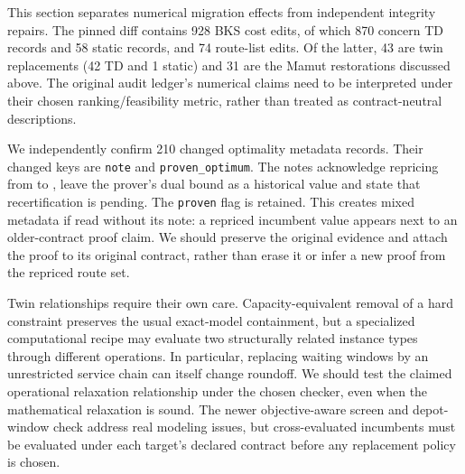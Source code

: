 This section separates numerical migration effects from independent integrity repairs. The pinned diff contains 928 BKS cost edits, of which 870 concern TD records and 58 static records, and 74 route-list edits. Of the latter, 43 are twin replacements (42 TD and 1 static) and 31 are the Mamut restorations discussed above. The original audit ledger's numerical claims need to be interpreted under their chosen ranking/feasibility metric, rather than treated as contract-neutral descriptions.

We independently confirm 210 changed optimality metadata records. Their changed keys are \texttt{note} and \texttt{proven\_optimum}. The notes acknowledge repricing from \contractone{} to \contracttwo{}, leave the prover's dual bound as a historical value and state that recertification is pending. The \texttt{proven} flag is retained. This creates mixed metadata if read without its note: a repriced incumbent value appears next to an older-contract proof claim. We should preserve the original evidence and attach the proof to its original contract, rather than erase it or infer a new proof from the repriced route set.

Twin relationships require their own care. Capacity-equivalent removal of a hard constraint preserves the usual exact-model containment, but a specialized computational recipe may evaluate two structurally related instance types through different operations. In particular, replacing waiting windows by an unrestricted service chain can itself change roundoff. We should test the claimed operational relaxation relationship under the chosen checker, even when the mathematical relaxation is sound. The newer objective-aware screen and depot-window check address real modeling issues, but cross-evaluated incumbents must be evaluated under each target's declared contract before any replacement policy is chosen.

